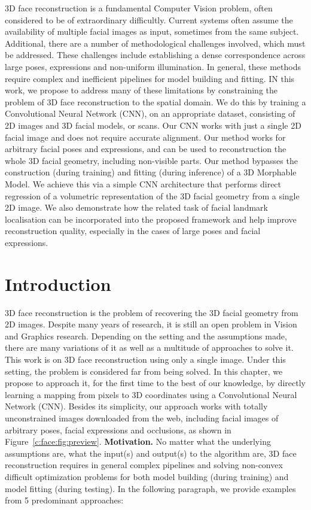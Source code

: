 3D face reconstruction is a fundamental Computer Vision problem, often
considered to be of extraordinary difficultly. Current systems often
assume the availability of multiple facial images as input, sometimes
from the same subject. Additional, there are a number of
methodological challenges involved, which must be addressed. These
challenges include establishing a dense correspondence across large
poses, expressions and non-uniform illumination. In general, these
methods require complex and inefficient pipelines for model building
and fitting. IN this work, we propose to address many of these
limitations by constraining the problem of 3D face reconstruction to
the spatial domain. We do this by training a Convolutional Neural
Network (CNN), on an appropriate dataset, consisting of 2D images and
3D facial models, or scans. Our CNN works with just a single 2D facial
image and does not require accurate alignment. Our method works for
arbitrary facial poses and expressions, and can be used to
reconstruction the whole 3D facial geometry, including non-visible
parts. Our method bypasses the construction (during training) and
fitting (during inference) of a 3D Morphable Model. We achieve this via
a simple CNN architecture that performs direct regression of a
volumetric representation of the 3D facial geometry from a single 2D
image. We also demonstrate how the related task of facial landmark
localisation can be incorporated into the proposed framework and help
improve reconstruction quality, especially in the cases of large poses
and facial expressions.


\section{Introduction}
3D face reconstruction is the problem of recovering the 3D facial
geometry from 2D images. Despite many years of research, it is still
an open problem in Vision and Graphics research. Depending on the
setting and the assumptions made, there are many variations of it as
well as a multitude of approaches to solve it. This work is on 3D face
reconstruction using only a single image. Under this setting, the
problem is considered far from being solved. In this chapter, we
propose to approach it, for the first time to the best of our
knowledge, by directly learning a mapping from pixels to 3D
coordinates using a Convolutional Neural Network (CNN). Besides its
simplicity, our approach works with totally unconstrained images
downloaded from the web, including facial images of arbitrary poses,
facial expressions and occlusions, as shown in
Figure~\ref{c:face:fig:preview}. \newline \textbf{Motivation.} No matter what
the underlying assumptions are, what the input(s) and output(s) to the
algorithm are, 3D face reconstruction requires in general complex
pipelines and solving non-convex difficult optimization problems for
both model building (during training) and model fitting (during
testing). In the following paragraph, we provide examples from 5
predominant approaches:

